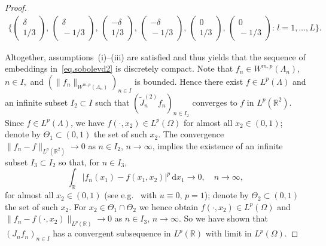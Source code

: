 \documentclass[a4paper,reqno]{amsart}
\begin{document}
\begin{proof}
\begin{align*}
\bigg\{
\begin{pmatrix} \delta \\ 1/3\end{pmatrix}, \,
\begin{pmatrix} \delta\\ \!-1/3\end{pmatrix},\,
\begin{pmatrix} -\delta\\ 1/3\end{pmatrix},\,
\begin{pmatrix} -\delta\\ \!-1/3\end{pmatrix},\,
\begin{pmatrix} 0\\ 1/3\end{pmatrix},\,
\begin{pmatrix} 0\\ \!-1/3\end{pmatrix}: \,l=1,\dots,L\bigg\}.
\end{align*}

Altogether, assumptions~(i)--(iii) are satisfied and thus  \cite[Satz 4.(9)]{grigorieffsobolev} 
yields that  the sequence of embeddings 
in~\eqref{eq.sobolevd2} is discretely compact.
Note that $f_n\in W^{m,p}(\Lambda_n)$, $n\in I,$ and $\left(\|f_n\|_{W^{m,p}(\Lambda_n)}\right)_{n\in I}$ is bounded.
Hence there exist $f\in L^p(\Lambda)$ and an infinite subset $I_2\subset I$ such that $(\widetilde J_n^{(2)}f_{n})_{n\in I_2}$ converges to $f$ in $L^p({\mathbb{R}}^2)$.
Since $f\in L^p(\Lambda)$,  we have $f(\cdot,x_2)\in L^p(\Omega)$ for almost all $x_2\in(0,1)$; denote by $\Theta_1\subset(0,1)$ the set of such $x_2$.
The convergence $\|f_n-f\|_{L^p({\mathbb{R}}^2)}\to 0$ as $n\in I_2$, $n\to\infty$, 
implies the existence of an infinite subset $I_3\subset I_2$ so that, for $n\in I_3$,
$$\int_{\mathbb{R}}|f_{n}(x_1)-f(x_1,x_2)|^p\,{\mathrm{d}} x_1{\longrightarrow} 0, \quad n\to\infty,$$
 for almost all $x_2\in(0,1)$ (see e.g.\ \cite[Theorem~B.98~(iii)]{leoni} with $u\equiv 0, \,p=1$); denote by $\Theta_2\subset(0,1)$ the set of such $x_2$.
For $x_2\in\Theta_1\cap\Theta_2$ we hence obtain $f(\cdot,x_2)\in L^p(\Omega)$  and  $\|f_{n}-f(\cdot,x_2)\|_{L^p({\mathbb{R}})}\to 0$ as $n\in I_3$, $n\to\infty$.
So we have shown that $(J_nf_n)_{n\in I}$ has a convergent subsequence in $L^p({\mathbb{R}})$ with limit in $L^p(\Omega)$.
\end{proof}
\end{document}
